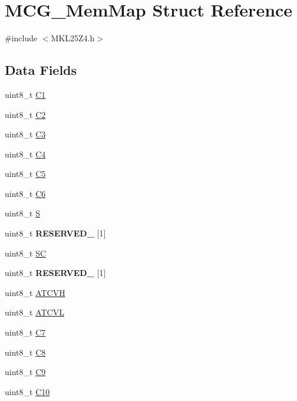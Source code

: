 \hypertarget{struct_m_c_g___mem_map}{}\section{M\+C\+G\+\_\+\+Mem\+Map Struct Reference}
\label{struct_m_c_g___mem_map}


{\ttfamily \#include $<$M\+K\+L25\+Z4.\+h$>$}

\subsection*{Data Fields}
\begin{DoxyCompactItemize}
\item 
uint8\+\_\+t \hyperlink{struct_m_c_g___mem_map_a433a36d1aeb9d033b502ee263c1495a1}{C1}
\item 
uint8\+\_\+t \hyperlink{struct_m_c_g___mem_map_a7323696b9a1cb6631b8c04ffad3947e5}{C2}
\item 
uint8\+\_\+t \hyperlink{struct_m_c_g___mem_map_a58ca70b30279c98af3471abe38280f01}{C3}
\item 
uint8\+\_\+t \hyperlink{struct_m_c_g___mem_map_a3c5615d70ed3f2d3664de1a8fdbe9983}{C4}
\item 
uint8\+\_\+t \hyperlink{struct_m_c_g___mem_map_a0e385950fe0f38c82eae57eb4ea2aaf3}{C5}
\item 
uint8\+\_\+t \hyperlink{struct_m_c_g___mem_map_ae7f9f9ae65de91e230a236ca4629380c}{C6}
\item 
uint8\+\_\+t \hyperlink{struct_m_c_g___mem_map_a65ee0333e0d5c462c7dd8c2402bf93be}{S}
\item 
\mbox{\label{struct_m_c_g___mem_map_a4a2bbf23e6c51743e808ba42e79d6128}} 
uint8\+\_\+t {\bfseries R\+E\+S\+E\+R\+V\+E\+D\+\_} \mbox{[}1\mbox{]}
\item 
uint8\+\_\+t \hyperlink{struct_m_c_g___mem_map_aeff584aa52340d7c66dc06789ad05310}{SC}
\item 
\mbox{\label{struct_m_c_g___mem_map_a612b54d367d5589e35fd249f6335f85c}} 
uint8\+\_\+t {\bfseries R\+E\+S\+E\+R\+V\+E\+D\+\_} \mbox{[}1\mbox{]}
\item 
uint8\+\_\+t \hyperlink{struct_m_c_g___mem_map_a74fee35955b4ec57aa8058bd57a926a8}{A\+T\+C\+VH}
\item 
uint8\+\_\+t \hyperlink{struct_m_c_g___mem_map_a913b6fd7776c0377e299fdf0eeb166af}{A\+T\+C\+VL}
\item 
uint8\+\_\+t \hyperlink{struct_m_c_g___mem_map_a7be430dafe8d0fddf4dbb83781946201}{C7}
\item 
uint8\+\_\+t \hyperlink{struct_m_c_g___mem_map_a346a8b8c5c2c675e6297aaa1f14798df}{C8}
\item 
uint8\+\_\+t \hyperlink{struct_m_c_g___mem_map_a35982b38fc8c8986c066146537c1c672}{C9}
\item 
uint8\+\_\+t \hyperlink{struct_m_c_g___mem_map_a184325f5e5750f8e816b01aeed13d695}{C10}
\end{DoxyCompactItemize}


